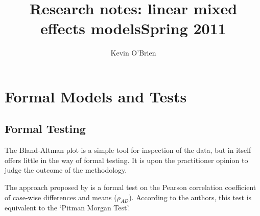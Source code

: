 \documentclass[12pt, a4paper]{report}
\title{Research notes: linear mixed effects models}
\author{ } \date{ }
\theoremstyle{plain}
\theoremstyle{definition}
\theoremstyle{remark}
\begin{document}
	\author{Kevin O'Brien}
	\title{Spring 2011}
	
	
	\tableofcontents



%



\chapter{Formal Models and Tests}



\section{Formal Testing}
The Bland-Altman plot is a simple tool for inspection of the data,
but in itself offers little in the way of formal testing. It is upon the practitioner opinion to judge the outcome of the methodology.

The approach proposed by \citet{BA83} is a formal test on the
Pearson correlation coefficient of case-wise differences and means
($\rho_{AD}$). According to the authors, this test is equivalent
to the `Pitman Morgan Test'. 
\end{document}
